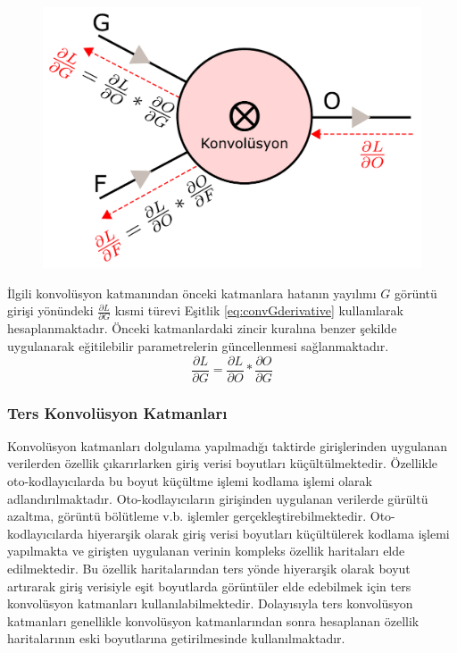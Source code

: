 \begin{figure}[h!]
	\begin{center}
		\vspace{0.4cm}
		{
			\vspace{0.4cm}
			\includegraphics[scale=0.6]{Yapilan-Calismalar/Figures/convDerivative.pdf}
		}
	\end{center}
\end{figure}

İlgili konvolüsyon katmanından önceki katmanlara hatanın yayılımı $G$ görüntü girişi yönündeki $\frac{\partial L}{\partial  G}$ kısmi türevi Eşitlik \ref{eq:convGderivative} kullanılarak hesaplanmaktadır. Önceki katmanlardaki zincir kuralına benzer şekilde uygulanarak eğitilebilir parametrelerin güncellenmesi sağlanmaktadır.
\begin{equation}
	\label{eq:convGderivative}
	\frac{\partial L}{\partial  G} = \frac{\partial L}{\partial  O}* \frac{\partial O}{\partial  G}
\end{equation}


\subsubsection{Ters Konvolüsyon Katmanları}

Konvolüsyon katmanları dolgulama yapılmadığı taktirde girişlerinden uygulanan verilerden özellik çıkarırlarken giriş verisi boyutları küçültülmektedir. Özellikle oto-kodlayıcılarda bu boyut küçültme işlemi kodlama işlemi olarak adlandırılmaktadır. Oto-kodlayıcıların girişinden uygulanan verilerde gürültü azaltma, görüntü bölütleme v.b. işlemler gerçekleştirebilmektedir. Oto-kodlayıcılarda hiyerarşik olarak giriş verisi boyutları küçültülerek kodlama işlemi yapılmakta ve girişten uygulanan verinin kompleks özellik haritaları elde edilmektedir. Bu özellik haritalarından ters yönde hiyerarşik olarak boyut artırarak giriş verisiyle eşit boyutlarda görüntüler elde edebilmek için ters konvolüsyon katmanları kullanılabilmektedir. Dolayısıyla ters konvolüsyon katmanları genellikle konvolüsyon katmanlarından sonra hesaplanan özellik haritalarının eski boyutlarına getirilmesinde kullanılmaktadır.

